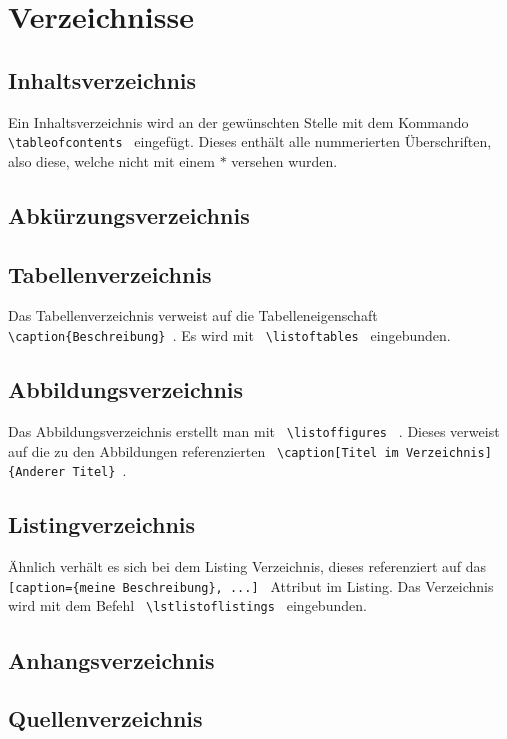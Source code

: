 \section{Verzeichnisse}
\subsection{Inhaltsverzeichnis}
Ein Inhaltsverzeichnis wird an der gewünschten Stelle mit dem Kommando 
\lstinline$ \tableofcontents $ eingefügt. Dieses enthält alle nummerierten 
Überschriften, also diese, welche nicht mit einem $*$ versehen wurden.
\subsection{Abkürzungsverzeichnis}



\subsection{Tabellenverzeichnis}
Das Tabellenverzeichnis verweist auf die Tabelleneigenschaft 
\lstinline$ \caption{Beschreibung} $. Es wird mit 
\lstinline $ \listoftables $ eingebunden.

\subsection{Abbildungsverzeichnis}
Das Abbildungsverzeichnis erstellt man mit \lstinline$ \listoffigures $ . 
Dieses verweist auf die zu den Abbildungen referenzierten 
\lstinline $ \caption[Titel im Verzeichnis]{Anderer Titel} $.
\subsection{Listingverzeichnis}
Ähnlich verhält es sich bei dem Listing Verzeichnis, dieses referenziert auf 
das \lstinline $ [caption={meine Beschreibung}, ...] $ Attribut im Listing.
Das Verzeichnis wird mit dem Befehl \lstinline $ \lstlistoflistings $ 
eingebunden.
\subsection{Anhangsverzeichnis}
\subsection{Quellenverzeichnis}